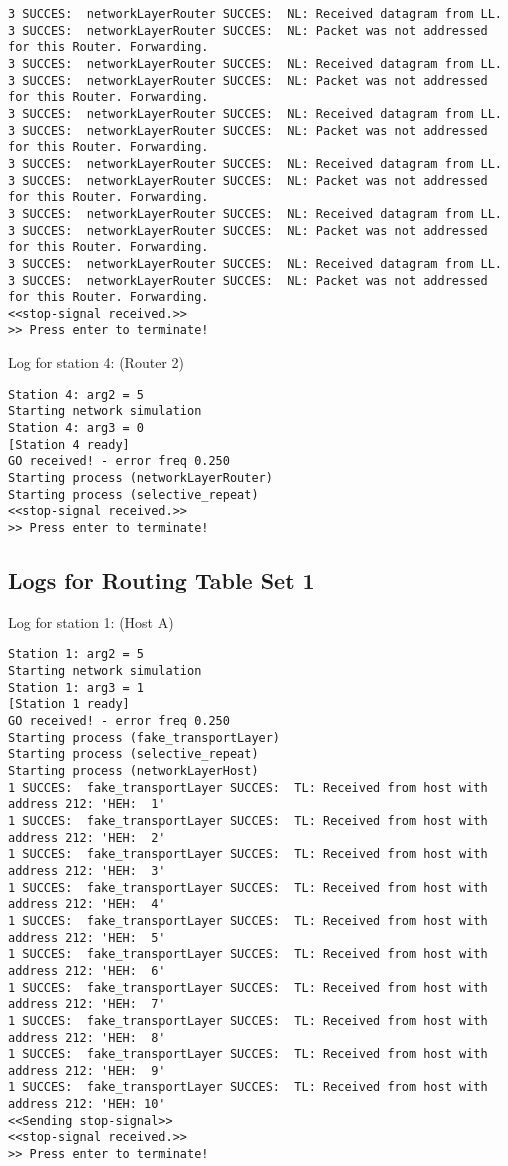 \begin{lstlisting}[breaklines=true]
3 SUCCES:  networkLayerRouter SUCCES:  NL: Received datagram from LL.
3 SUCCES:  networkLayerRouter SUCCES:  NL: Packet was not addressed for this Router. Forwarding.
3 SUCCES:  networkLayerRouter SUCCES:  NL: Received datagram from LL.
3 SUCCES:  networkLayerRouter SUCCES:  NL: Packet was not addressed for this Router. Forwarding.
3 SUCCES:  networkLayerRouter SUCCES:  NL: Received datagram from LL.
3 SUCCES:  networkLayerRouter SUCCES:  NL: Packet was not addressed for this Router. Forwarding.
3 SUCCES:  networkLayerRouter SUCCES:  NL: Received datagram from LL.
3 SUCCES:  networkLayerRouter SUCCES:  NL: Packet was not addressed for this Router. Forwarding.
3 SUCCES:  networkLayerRouter SUCCES:  NL: Received datagram from LL.
3 SUCCES:  networkLayerRouter SUCCES:  NL: Packet was not addressed for this Router. Forwarding.
3 SUCCES:  networkLayerRouter SUCCES:  NL: Received datagram from LL.
3 SUCCES:  networkLayerRouter SUCCES:  NL: Packet was not addressed for this Router. Forwarding.
<<stop-signal received.>>
>> Press enter to terminate!
\end{lstlisting}

Log for station 4: (Router 2)
\begin{lstlisting}[breaklines=true]
Station 4: arg2 = 5
Starting network simulation
Station 4: arg3 = 0
[Station 4 ready]
GO received! - error freq 0.250
Starting process (networkLayerRouter)
Starting process (selective_repeat)
<<stop-signal received.>>
>> Press enter to terminate!
\end{lstlisting}

\subsection{Logs for Routing Table Set 1}
Log for station 1: (Host A)
\begin{lstlisting}[breaklines=true]
Station 1: arg2 = 5
Starting network simulation
Station 1: arg3 = 1
[Station 1 ready]
GO received! - error freq 0.250
Starting process (fake_transportLayer)
Starting process (selective_repeat)
Starting process (networkLayerHost)
1 SUCCES:  fake_transportLayer SUCCES:  TL: Received from host with address 212: 'HEH:  1'
1 SUCCES:  fake_transportLayer SUCCES:  TL: Received from host with address 212: 'HEH:  2'
1 SUCCES:  fake_transportLayer SUCCES:  TL: Received from host with address 212: 'HEH:  3'
1 SUCCES:  fake_transportLayer SUCCES:  TL: Received from host with address 212: 'HEH:  4'
1 SUCCES:  fake_transportLayer SUCCES:  TL: Received from host with address 212: 'HEH:  5'
1 SUCCES:  fake_transportLayer SUCCES:  TL: Received from host with address 212: 'HEH:  6'
1 SUCCES:  fake_transportLayer SUCCES:  TL: Received from host with address 212: 'HEH:  7'
1 SUCCES:  fake_transportLayer SUCCES:  TL: Received from host with address 212: 'HEH:  8'
1 SUCCES:  fake_transportLayer SUCCES:  TL: Received from host with address 212: 'HEH:  9'
1 SUCCES:  fake_transportLayer SUCCES:  TL: Received from host with address 212: 'HEH: 10'
<<Sending stop-signal>>
<<stop-signal received.>>
>> Press enter to terminate!
\end{lstlisting}

